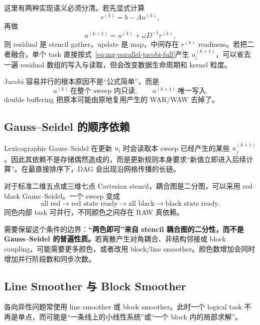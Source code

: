 这里有两种实现语义必须分清。若先显式计算
\begin{equation}
r^{(k)}=b-Au^{(k)},
\end{equation}
再做
\begin{equation}
u^{(k+1)}=u^{(k)}+\omega D^{-1}r^{(k)},
\end{equation}
则 residual 是 stencil gather，update 是 map，中间存在 $r^{(k)}$ readiness。若把二者融合，单个 task 直接按式~\eqref{eq:mg-parallel-jacobi-full}产生 $u_i^{(k+1)}$，可以省去一遍 residual 数组的写入与读取，但会改变数据生命周期和 kernel 粒度。

Jacobi 容易并行的根本原因不是“公式简单”，而是
\begin{equation}
\boxed{
u^{(k)}\ \text{在整个 sweep 内只读},
\qquad
u^{(k+1)}\ \text{唯一写入}.
}
\end{equation}
double buffering 把原本可能由原地复用产生的 WAR/WAW 去掉了。

\subsection{Gauss--Seidel 的顺序依赖}

Lexicographic Gauss--Seidel 在更新 $u_i$ 时会读取本 sweep 已经产生的某些 $u_j^{(k+1)}$。因此其依赖不是存储偶然造成的，而是更新规则本身要求“新值立即进入后续计算”。在最直接排序下，DAG 会出现沿网格传播的长链。

对于标准二维五点或三维七点 Cartesian stencil，耦合图是二分图，可以采用 red--black Gauss--Seidel。一个 sweep 变成
\begin{equation}
\boxed{
\text{all red}
\rightarrow
\text{red state ready}
\rightarrow
\text{all black}
\rightarrow
\text{black state ready}.
}
\label{eq:mg-rbgs-dag}
\end{equation}
同色内部 task 可并行，不同颜色之间存在 RAW 真依赖。

需要保留这个条件的边界：\textbf{“两色即可”来自 stencil 耦合图的二分性，而不是 Gauss--Seidel 的普遍性质。}若离散产生对角耦合、非结构邻接或 block coupling，可能需要更多颜色，或者改用 block/line smoother。颜色数增加会同时增加并行阶段数和同步次数。

\subsection{Line Smoother 与 Block Smoother}

各向异性问题常使用 line smoother 或 block smoother。此时一个 logical task 不再是单点，而可能是“一条线上的小线性系统”或“一个 block 内的局部求解”。


